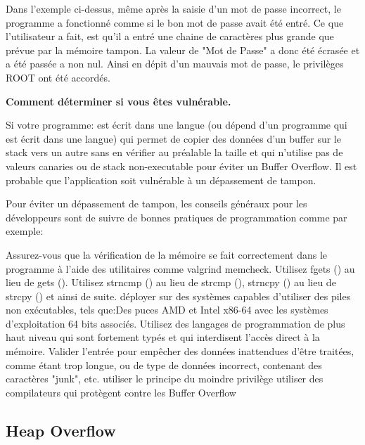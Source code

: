 \begin{flushleft}
Dans l'exemple ci-dessus, même après la saisie d'un mot de passe incorrect, le programme a fonctionné comme si le bon mot de passe avait été entré.
Ce que l'utilisateur a fait, est qu'il a entré une chaine de caractères plus grande que prévue par la mémoire tampon. La valeur de "Mot de Passe" a donc été écrasée et a été passée a non nul. Ainsi en dépit d'un mauvais mot de passe, le privilèges ROOT ont été accordés.
\end{flushleft}

\begin{flushleft}
\textbf{Comment déterminer si vous êtes vulnérable.}
\end{flushleft}

\begin{flushleft}
Si votre programme:
est écrit dans une langue (ou dépend d'un programme qui est écrit dans une langue) qui permet de copier des données d'un buffer sur le stack vers un autre sans en vérifier au préalable la taille et qui n'utilise pas de valeurs canaries ou de stack non-executable pour éviter un Buffer Overflow. Il est probable que l'application soit vulnérable à un dépassement de tampon.
\end{flushleft}

\begin{flushleft}
Pour éviter un dépassement de tampon, les conseils généraux pour les développeurs sont de suivre de bonnes pratiques de programmation comme par exemple: 
\end{flushleft}
\begin{flushleft}
Assurez-vous que la vérification de la mémoire se fait correctement dans le programme à l'aide des utilitaires comme valgrind memcheck.
Utilisez fgets () au lieu de gets ().
Utilisez strncmp () au lieu de strcmp (), strncpy () au lieu de strcpy () et ainsi de suite. déployer sur des systèmes capables d'utiliser des piles non exécutables, tels que:Des puces AMD et Intel x86-64  avec les systèmes d'exploitation 64 bits associés.
Utilisez des langages de programmation de plus haut niveau qui sont fortement typés et qui interdisent l'accès direct à la mémoire.
Valider l'entrée pour empêcher  des données inattendues d'être traitées, comme étant trop longue, ou de type de données incorrect, contenant des caractères "junk", etc.
utiliser le principe du moindre privilège
utiliser des compilateurs qui protègent contre les Buffer Overflow 
\end{flushleft}


\subsection{Heap Overflow}\label{vulnerabilites:applicatives:buffer-overflow:heap}


